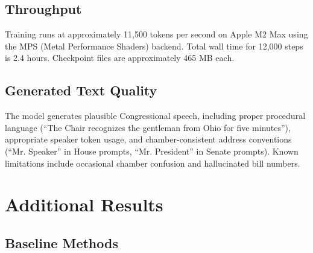 \documentclass[12pt]{article}
\begin{document}
\subsection{Throughput}

Training runs at approximately 11,500 tokens per second on Apple M2 Max using the MPS (Metal Performance Shaders) backend. Total wall time for 12,000 steps is 2.4 hours. Checkpoint files are approximately 465 MB each.

\subsection{Generated Text Quality}

The model generates plausible Congressional speech, including proper procedural language (``The Chair recognizes the gentleman from Ohio for five minutes''), appropriate speaker token usage, and chamber-consistent address conventions (``Mr. Speaker'' in House prompts, ``Mr. President'' in Senate prompts). Known limitations include occasional chamber confusion and hallucinated bill numbers.


\section{Additional Results}
\label{app:results}

\subsection{Baseline Methods}
\end{document}
